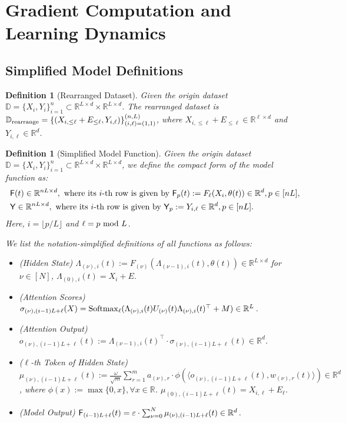 \documentclass[11pt]{article}
\theoremstyle{plain}
\newtheorem{definition}[theorem]{Definition}
\newcommand{\R}{\mathbb{R}}
\begin{document}
\newpage%
\section{Gradient Computation and Learning Dynamics}\label{app:proof_learning_dynamics}

\subsection{Simplified Model Definitions}

\begin{definition}[Rearranged Dataset]
    Given the origin dataset $\mathbb{D} = \{X_i, Y_i\}_{i=1}^n \subset \R^{L \times d} \times \R^{L \times d }$. The rearranged dataset is $\mathbb{D}_{\rm rearrange} = \{ (X_{i, \le \ell} + E_{\leq \ell}, Y_{i, \ell}) \}_{(i, \ell)=(1, 1)}^{(n, L)}$, where $X_{i, \le \ell}+ E_{\leq \ell} \in \R^{\ell \times d}$ and $Y_{i, \ell} \in \R^d$. 
\end{definition}


\begin{definition}[Simplified Model Function]
    Given the origin dataset $\mathbb{D} = \{X_i, Y_i\}_{i=1}^n \subset \R^{L \times d} \times \R^{L \times d }$, we define the compact form of the model function as:
    \begin{align*}
        & ~  {\sf F}(t) \in \R^{nL \times d}, \text{~where its $i$-th row is given by~} {\sf F}_p(t) := F_{\ell}(X_i, \theta(t)) \in \R^d, p \in [nL], \\
        & ~ {\sf Y} \in \R^{nL \times d} , \text{~where its $i$-th row is given by~} {\sf Y}_p := Y_{i, \ell} \in \R^d, p \in [nL].
    \end{align*}
    Here, $i = \lfloor p / L \rfloor$ and $\ell = p {\rm ~ mod~} L$.

    We list the notation-simplified definitions of all functions as follows:
    \begin{itemize}
        \item (Hidden State) $\Lambda_{(\nu), i}(t) := F_{(\nu)}(\Lambda_{(\nu-1), i}(t), \theta(t)) \in \R^{L \times d}$ for $\nu \in [N]$, $\Lambda_{(0), i}(t) = X_{i} + E$.
        \item (Attention Scores) $ \sigma_{(\nu), (i-1)L+\ell}(X) =  {\rm Softmax}_{\ell}( \Lambda_{(\nu), i}(t) U_{(\nu)}(t) \Lambda_{(\nu), i}(t)^\top + M ) \in \R^{L}$.
        \item (Attention Output) $o_{(\nu), (i-1)L+\ell}(t) := \Lambda_{(\nu-1), i}(t)^\top \cdot \sigma_{(\nu), (i-1)L+\ell}(t) \in \R^d$.
        \item ($\ell$-th Token of Hidden State) $\mu_{(\nu), (i-1)L+\ell}(t) := \frac{\omega}{\sqrt{m}} \sum_{r=1}^m a_{(\nu), r} \cdot  \phi( \langle o_{(\nu), (i-1)L+\ell}(t), w_{(\nu), r}(t) \rangle) \in \R^d$, where $\phi(x) := \max\{0, x\}, \forall x \in \R$. $\mu_{(0), (i-1)L+\ell}(t) = X_{i, \ell} + E_\ell$.
        \item (Model Output) ${\sf F}_{(i-1)L+\ell}(t) = \varepsilon \cdot \sum_{\nu=0}^N \mu_{(\nu), (i-1)L+\ell}(t) \in \R^{d}$.
    \end{itemize}
\end{definition}
\end{document}
